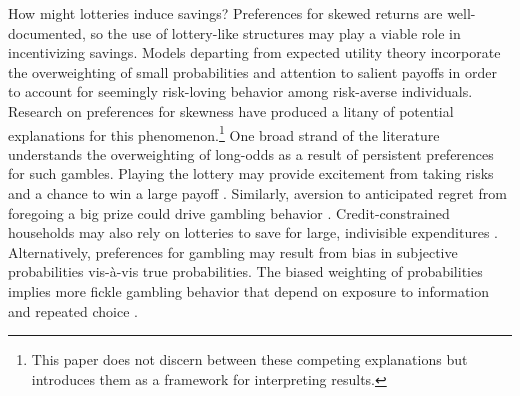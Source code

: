 \documentclass[11pt]{article}
\begin{document}

	How might lotteries induce savings? Preferences for skewed returns are well-documented, so the use of lottery-like structures may play a viable role in incentivizing savings. Models departing from expected utility theory incorporate the overweighting of small probabilities  and attention to salient payoffs  in order to account for seemingly risk-loving behavior among risk-averse individuals. Research on preferences for skewness have produced a litany of potential explanations for this phenomenon.\footnote{This paper does not discern between these competing explanations but introduces them as a framework for interpreting results.} One broad strand of the literature understands the overweighting of long-odds as a result of persistent preferences for such gambles. Playing the lottery may provide excitement from taking risks and a chance to win a large payoff . Similarly, aversion to anticipated regret from foregoing a big prize could drive gambling behavior . Credit-constrained households may also rely on lotteries to save for large, indivisible expenditures . Alternatively, preferences for gambling may result from bias in subjective probabilities vis-\`{a}-vis true probabilities. The biased weighting of probabilities implies more fickle gambling behavior that depend on exposure to information and repeated choice .

\end{document}
